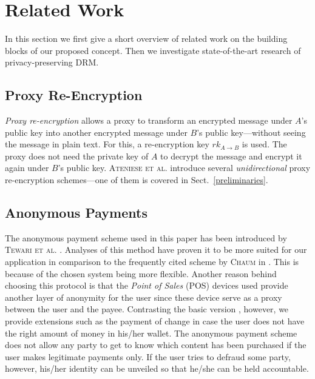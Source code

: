 \documentclass{llncs}
\newcommand{\refSec}[1]{Sect.~\ref{#1}}
\begin{document}
\section{Related Work} \label{related_work}

In this section we first give a short overview of related work on the building blocks of our proposed concept. Then we investigate state-of-the-art research of privacy-preserving DRM. 

\subsection{Proxy Re-Encryption}

\emph{Proxy re-encryption} allows a proxy to transform an encrypted message under $A$'s public key into another encrypted message under $B$'s public key---without seeing the message in plain text. For this, a re-encryption key $rk_{A \rightarrow B}$ is used. The proxy does not need the private key of $A$ to decrypt the message and encrypt it again under $B$'s public key. \textsc{Ateniese et al.} \cite{ateniese_improved} introduce several \emph{unidirectional} proxy re-encryption schemes---one of them is covered in \refSec{preliminaries}. 


\subsection{Anonymous Payments} \label{payment}

The anonymous payment scheme used in this paper has been introduced by \textsc{Tewari et al.} \cite{Tewari1998}. Analyses of this method have proven it to be more suited for our application in comparison to the frequently cited scheme by \textsc{Chaum} \cite{chaum_cash} in \cite{architecture}. This is because of the chosen system being more flexible. Another reason behind choosing this protocol is that the \emph{Point of Sales} (POS) devices used provide another layer of anonymity for the user since these device serve as a proxy between the user and the payee. Contrasting the basic version \cite{Tewari1998}, however, we provide extensions such as the payment of change in case the user does not have the right amount of money in his/her wallet. The anonymous payment scheme does not allow any party to get to know which content has been purchased if the user makes legitimate payments only. If the user tries to defraud some party, however, his/her identity can be unveiled so that he/she can be held accountable.
\end{document}
